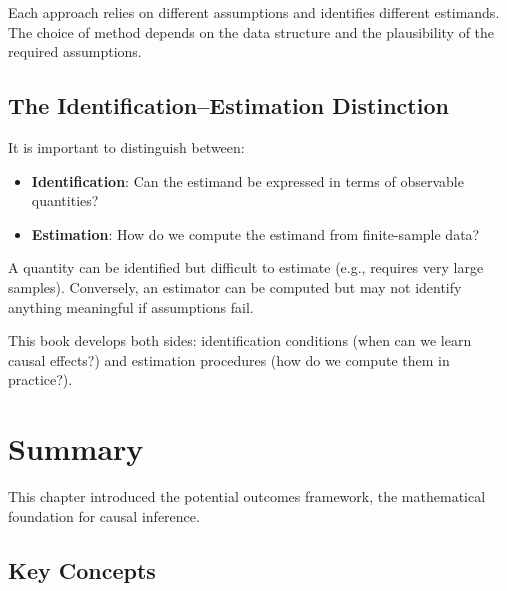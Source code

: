 Each approach relies on different assumptions and identifies different estimands. The choice of method depends on the data structure and the plausibility of the required assumptions.

\subsection{The Identification--Estimation Distinction}

It is important to distinguish between:
\begin{itemize}
    \item \textbf{Identification}: Can the estimand be expressed in terms of observable quantities?
    \item \textbf{Estimation}: How do we compute the estimand from finite-sample data?
\end{itemize}

A quantity can be identified but difficult to estimate (e.g., requires very large samples). Conversely, an estimator can be computed but may not identify anything meaningful if assumptions fail.

This book develops both sides: identification conditions (when can we learn causal effects?) and estimation procedures (how do we compute them in practice?).


\section{Summary}
\label{sec:po_summary}

This chapter introduced the potential outcomes framework, the mathematical foundation for causal inference.

\subsection{Key Concepts}

